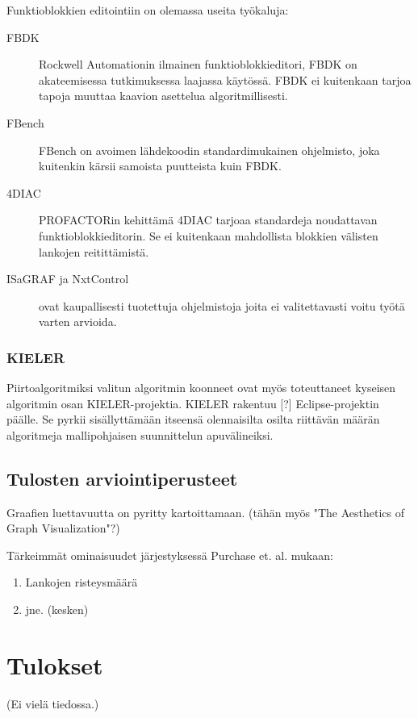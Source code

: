 \documentclass[finnish,12pt]{article}
\begin{document}
Funktioblokkien editointiin on olemassa useita työkaluja:
\begin{description}
	\item[FBDK] Rockwell Automationin ilmainen funktioblokkieditori, FBDK on akateemisessa tutkimuksessa laajassa käytössä. FBDK ei kuitenkaan tarjoa tapoja muuttaa kaavion asettelua algoritmillisesti.
	\item[FBench] FBench on avoimen lähdekoodin standardimukainen ohjelmisto, joka kuitenkin kärsii samoista puutteista kuin FBDK.
	\item[4DIAC] PROFACTORin kehittämä 4DIAC tarjoaa standardeja noudattavan funktioblokkieditorin. Se ei kuitenkaan mahdollista blokkien välisten lankojen reitittämistä. 
	\item[ISaGRAF ja NxtControl] ovat kaupallisesti tuotettuja ohjelmistoja joita ei valitettavasti voitu työtä varten arvioida.
\end{description}

			\subsubsection{KIELER}

Piirtoalgoritmiksi valitun algoritmin koonneet ovat myös toteuttaneet kyseisen algoritmin osan KIELER-projektia.
KIELER rakentuu [?] Eclipse-projektin päälle. Se pyrkii sisällyttämään itseensä olennaisilta osilta riittävän määrän algoritmeja mallipohjaisen suunnittelun apuvälineiksi.

		\subsection{Tulosten arviointiperusteet}

Graafien luettavuutta on pyritty kartoittamaan. \cite{RefWorks:47}
(tähän myös "The Aesthetics of Graph Visualization"?)

Tärkeimmät ominaisuudet järjestyksessä Purchase et. al. mukaan: 
\begin{enumerate}
  \item Lankojen risteysmäärä
  \item jne. (kesken)
\end{enumerate}

	\clearpage
	\section{Tulokset}
	
(Ei vielä tiedossa.)
\end{document}
